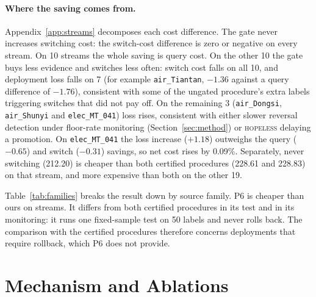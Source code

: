 \documentclass[10pt]{article}
\begin{document}
\paragraph{Where the saving comes from.} Appendix~\ref{app:streams} decomposes each cost
difference. The gate never increases switching cost: the switch-cost difference is zero or
negative on every stream. On 10 streams the whole saving is query cost. On the other 10 the gate
buys less evidence and switches less often: switch cost falls on all 10, and deployment loss falls
on 7 (for example \texttt{air\_Tiantan}, $-1.36$ against a query difference of $-1.76$),
consistent with some of the ungated procedure's extra labels triggering switches that did not pay
off. On the remaining 3 (\texttt{air\_Dongsi}, \texttt{air\_Shunyi} and \texttt{elec\_MT\_041})
loss rises, consistent with either slower reversal detection under floor-rate monitoring
(Section~\ref{sec:method}) or \textsc{hopeless} delaying a promotion.
On \texttt{elec\_MT\_041} the loss increase ($+1.18$) outweighs the query ($-0.65$) and switch
($-0.31$) savings, so net cost rises by 0.09\%. Separately, never switching (212.20) is cheaper
than both certified procedures (228.61 and 228.83) on that stream, and more expensive than both on
the other 19.

\begin{table}[!htb]\centering\footnotesize\setlength{\tabcolsep}{2.5pt}
\caption{Results by source family. Cheaper/equal/dearer compares ours with \textsf{P3b}. Matching
summaries is the share of episodes with matching deployment summaries. P6 cheaper counts streams
where \textsf{P6} has lower mean cost than ours.}
\label{tab:families}

\end{table}

Table~\ref{tab:families} breaks the result down by source family. \textsf{P6} is cheaper than ours
on \NSixCheaper{} streams. It differs from both certified procedures in its test and in its
monitoring: it runs one fixed-sample test on 50 labels and never rolls back. The comparison with
the certified procedures therefore concerns deployments that require rollback, which \textsf{P6}
does not provide.

\section{Mechanism and Ablations}\label{sec:ablation}
\begin{table}[!t]\centering\small
\caption{Ablation on \texttt{spam} and \texttt{rialto} under the primary configuration; $\Delta$ is
the paired cost difference against \textsf{P3b}.}
\label{tab:ablation}

\end{table}
\end{document}
